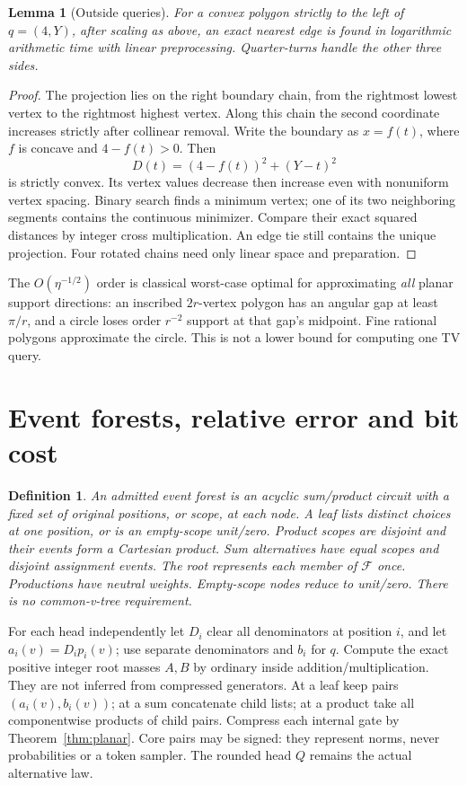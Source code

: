 \documentclass[11pt]{article}
\newtheorem{lemma}{Lemma}
\newtheorem{definition}{Definition}
\begin{document}
\begin{lemma}[Outside queries]\label{lem:query}
For a convex polygon strictly to the left of $q=(4,Y)$, after scaling as
above, an exact nearest edge is found in logarithmic arithmetic time with
linear preprocessing. Quarter-turns handle the other three sides.
\end{lemma}
\begin{proof}
The projection lies on the right boundary chain, from the rightmost
lowest vertex to the rightmost highest vertex. Along this chain the second
coordinate increases strictly after collinear removal. Write the boundary
as $x=f(t)$, where $f$ is concave and $4-f(t)>0$. Then
\[
 D(t)=(4-f(t))^2+(Y-t)^2
\]
is strictly convex. Its vertex values decrease then increase even with
nonuniform vertex spacing. Binary search finds a minimum vertex; one of its
two neighboring segments contains the continuous minimizer. Compare their
exact squared distances by integer cross multiplication. An edge tie still
contains the unique projection. Four rotated chains need only linear space
and preparation.
\end{proof}

The $O(\eta^{-1/2})$ order is classical worst-case optimal for approximating
\emph{all} planar support directions: an inscribed $2r$-vertex polygon has
an angular gap at least $\pi/r$, and a circle loses order $r^{-2}$ support
at that gap's midpoint. Fine rational polygons approximate the circle.
This is not a lower bound for computing one TV query.

\section{Event forests, relative error and bit cost}
\begin{definition}
An admitted event forest is an acyclic sum/product circuit with a fixed set
of original positions, or scope, at each node. A leaf lists distinct choices
at one position, or is an empty-scope unit/zero. Product scopes are disjoint
and their events form a Cartesian product. Sum alternatives have equal scopes
and disjoint assignment events. The root represents each member of
$\mathcal F$ once. Productions have neutral weights. Empty-scope nodes reduce
to unit/zero. There is no common-v-tree requirement.
\end{definition}

For each head independently let $D_i$ clear all denominators at position $i$,
and let $a_i(v)=D_i p_i(v)$; use separate denominators and $b_i$ for $q$.
Compute the exact positive integer root masses $A,B$ by ordinary inside
addition/multiplication. They are not inferred from compressed generators.
At a leaf keep pairs $(a_i(v),b_i(v))$; at a sum concatenate child lists;
at a product take all componentwise products of child pairs. Compress each
internal gate by Theorem~\ref{thm:planar}.
Core pairs may be signed: they represent norms, never probabilities or a
token sampler. The rounded head $Q$ remains the actual alternative law.
\end{document}

